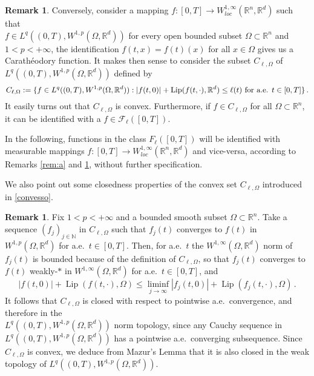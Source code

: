 \documentclass[11pt]{article}
\theoremstyle{plain}
\theoremstyle{definition}
\newtheorem{remark}[theorem]{Remark}
\theoremstyle{remark}
\numberwithin{equation}{section}
\newcommand{\R}{{\mathbb R}}
\newcommand{\Rn}{{\R}^n}
\newcommand{\Om}{\Omega}
\begin{document}
\begin{remark}\label{rem:b}
Conversely, consider a mapping $f:[0, T] \to W^{1,\infty}_{loc}(\Rn,\R^d)$ such that \\$f \in L^q((0,T), W^{1,p}(\Om,\R^d))$ for every open bounded subset $\Om \subset \Rn$ and $1< p <+\infty$, the identification $f(t,x)=f(t)(x)$ for all $x\in \Om$ gives us a Carath{\'e}odory function. It makes then sense to consider the subset $C_{\ell,\Om}$ of $L^q((0,T), W^{1,p}(\Om,\R^d))$ defined by
\begin{equation}\label{convesso}
C_{\ell,\Om}:=\{f\in L^q((0,T), W^{1,p}(\Om,\R^d)): |f(t,0)| + \operatorname{Lip}(f(t,\cdot),\mathbb R^d) \leq \ell(t)\hbox{ for a.e. }t \in [0,T]\}\,.
\end{equation}
It easily turns out that $C_{\ell,\Om}$ is convex. Furthermore, if $f \in C_{\ell,\Om}$ for all $\Om \subset \Rn$, it can be identified with a $f \in \mathcal F_\ell([0,T])$.
\end{remark}
In the following, functions in the class $F_\ell([0, T])$ will be identified with measurable mappings $f:[0, T] \to W^{1,\infty}_{loc}(\Rn,\R^d)$ and vice-versa, according to Remarks \ref{rem:a} and \ref{rem:b}, without further specification.

We also point out some closedness properties of the convex set $C_{\ell, \Om}$ introduced in \eqref{convesso}.


\begin{remark}\label{rem:closedness}
Fix $1<p<+\infty$ and a bounded smooth subset $\Om \subset \Rn$. Take a sequence $(f_j)_{j \in \mathbb N}$ in $C_{\ell,\Om}$
such that $f_j(t)$ converges to $f(t)$ in $W^{1,p}(\Om, \mathbb R^d)$ for a.e.\ $t \in [0,T]$. Then, for a.e.\ $t$ the $W^{1,\infty}(\Om,\R^d)$ norm of $f_j(t)$ is bounded because of the definition of $C_{\ell,\Om}$, so that $f_j(t)$ converges to $f(t)$ weakly-$*$ in $W^{1,\infty}(\Om, \mathbb R^d)$ for a.e.\ $t \in [0,T]$, and
$$
|f(t,0)| + \operatorname{Lip}(f(t,\cdot),\Omega) \leq \liminf_{j \to \infty} |f_j(t,0)| + \operatorname{Lip}(f_j(t,\cdot),\Omega)\,.
$$
It follows that $C_{\ell,\Om}$ is closed with respect to pointwise a.e.\ convergence, and therefore in the \\ $L^q((0,T), W^{1,p}(\Om,\R^d))$ norm topology, since any Cauchy sequence in $L^q((0,T), W^{1,p}(\Om,\R^d))$ has a pointwise a.e.\ converging subsequence. 
Since $C_{\ell, \Om}$ is convex, we deduce from Mazur's Lemma that it is also closed in the weak topology of $L^q((0,T), W^{1,p}(\Om,\R^d))$.
\end{remark}
\end{document}
